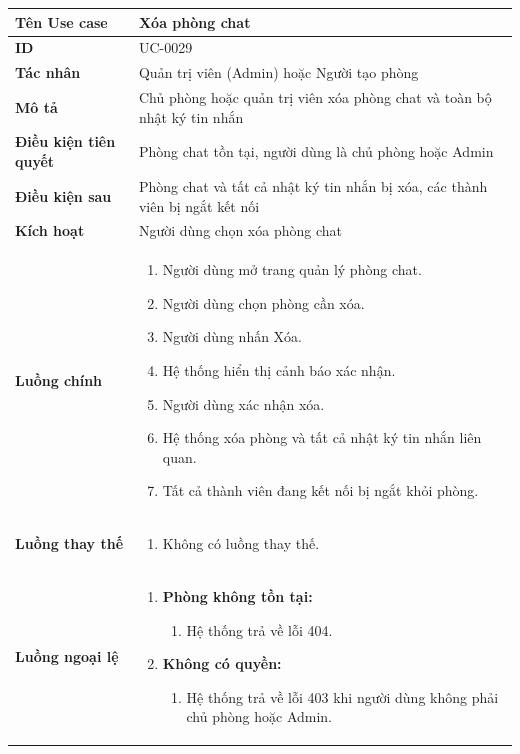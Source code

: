 {
\renewcommand{\arraystretch}{1.5}

\begin{tabularx}{\textwidth}{|>{\raggedright\arraybackslash}X|>{\raggedright\arraybackslash}X|}
\hline
\textbf{Tên Use case} & Xóa phòng chat \\
\hline
\textbf{ID} & UC-0029 \\
\hline
\textbf{Tác nhân} & Quản trị viên (Admin) hoặc Người tạo phòng \\
\hline
\textbf{Mô tả} & Chủ phòng hoặc quản trị viên xóa phòng chat và toàn bộ nhật ký tin nhắn \\
\hline
\textbf{Điều kiện tiên quyết} & Phòng chat tồn tại, người dùng là chủ phòng hoặc Admin \\
\hline
\textbf{Điều kiện sau} & Phòng chat và tất cả nhật ký tin nhắn bị xóa, các thành viên bị ngắt kết nối \\
\hline
\textbf{Kích hoạt} & Người dùng chọn xóa phòng chat \\
\hline
\textbf{Luồng chính} &
\begin{enumerate}
    \item Người dùng mở trang quản lý phòng chat.
    \item Người dùng chọn phòng cần xóa.
    \item Người dùng nhấn Xóa.
    \item Hệ thống hiển thị cảnh báo xác nhận.
    \item Người dùng xác nhận xóa.
    \item Hệ thống xóa phòng và tất cả nhật ký tin nhắn liên quan.
    \item Tất cả thành viên đang kết nối bị ngắt khỏi phòng.
\end{enumerate} \\
\hline
\textbf{Luồng thay thế} &
\begin{enumerate}
    \item Không có luồng thay thế.
\end{enumerate} \\
\hline
\textbf{Luồng ngoại lệ} &
\begin{enumerate}
    \item \textbf{Phòng không tồn tại:}
    \begin{enumerate}
        \item[2Err.] Hệ thống trả về lỗi 404.
    \end{enumerate}
    \item \textbf{Không có quyền:}
    \begin{enumerate}
        \item[2Err2.] Hệ thống trả về lỗi 403 khi người dùng không phải chủ phòng hoặc Admin.
    \end{enumerate}
\end{enumerate} \\
\hline
\end{tabularx}
}
